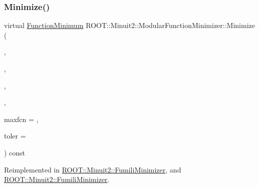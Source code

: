 \subsubsection{\texorpdfstring{Minimize()}{Minimize()}\hspace{0.1cm}{\footnotesize\ttfamily [16/22]}}
{\footnotesize\ttfamily virtual \mbox{\hyperlink{classROOT_1_1Minuit2_1_1FunctionMinimum}{Function\+Minimum}} R\+O\+O\+T\+::\+Minuit2\+::\+Modular\+Function\+Minimizer\+::\+Minimize (\begin{DoxyParamCaption}\item[{const \mbox{\hyperlink{classROOT_1_1Minuit2_1_1FCNGradientBase}{F\+C\+N\+Gradient\+Base}} \&}]{,  }\item[{const \mbox{\hyperlink{classROOT_1_1Minuit2_1_1MnUserParameters}{Mn\+User\+Parameters}} \&}]{,  }\item[{const \mbox{\hyperlink{classROOT_1_1Minuit2_1_1MnUserCovariance}{Mn\+User\+Covariance}} \&}]{,  }\item[{const \mbox{\hyperlink{classROOT_1_1Minuit2_1_1MnStrategy}{Mn\+Strategy}} \&}]{,  }\item[{unsigned int}]{maxfcn = {},  }\item[{double}]{toler = {} }\end{DoxyParamCaption}) const\hspace{0.3cm}{\ttfamily [virtual]}}



Reimplemented in \mbox{\hyperlink{classROOT_1_1Minuit2_1_1FumiliMinimizer_adb2739d40e10cce1923e5a21dac3f420}{R\+O\+O\+T\+::\+Minuit2\+::\+Fumili\+Minimizer}}, and \mbox{\hyperlink{classROOT_1_1Minuit2_1_1FumiliMinimizer_adb2739d40e10cce1923e5a21dac3f420}{R\+O\+O\+T\+::\+Minuit2\+::\+Fumili\+Minimizer}}.

\mbox{\label{classROOT_1_1Minuit2_1_1ModularFunctionMinimizer_a1ae6ed90bc87c3db98388f3d26980a51}} 
